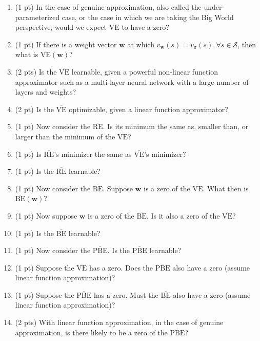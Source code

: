 \documentclass[main.tex]{subfiles}
\begin{document}
{\begin{enumerate}
    \item[(a)] (1 pt) In the case of genuine approximation, also called the under-parameterized case, or the case in which we are taking the Big World perspective, would we expect $\overline{\text{VE}}$ to have a zero?
    \item[(b)] (1 pt) If there is a weight vector $\mathbf{w}$ at which $v_\mathbf{w}(s) = v_\pi(s), \forall s \in \mathcal{S}$, then what is $\overline{\text{VE}}(\mathbf{w})$?
    \item[(c)] (2 pts) Is the $\overline{\text{VE}}$ learnable, given a powerful non-linear function approximator such as a multi-layer neural network with a large number of layers and weights?
    \item[(d)] (2 pt) Is the $\overline{\text{VE}}$ optimizable, given a linear function approximator?
    \item[(e)] (1 pt) Now consider the $\overline{\text{RE}}$. Is its minimum the same as, smaller than, or larger than the minimum of the $\overline{\text{VE}}$?
    \item[(f)] (1 pt) Is $\overline{\text{RE}}$'s minimizer the same as $\overline{\text{VE}}$'s minimizer?
    \item[(g)] (1 pt) Is the $\overline{\text{RE}}$ learnable?
    \item[(h)] (1 pt) Now consider the $\overline{\text{BE}}$. Suppose $\mathbf{w}$ is a zero of the $\overline{\text{VE}}$. What then is $\overline{\text{BE}}(\mathbf{w})$?
    \item[(i)] (1 pt) Now suppose $\mathbf{w}$ is a zero of the $\overline{\text{BE}}$. Is it also a zero of the $\overline{\text{VE}}$?
    \item[(j)] (1 pt) Is the $\overline{\text{BE}}$ learnable?
    \item[(k)] (1 pt) Now consider the $\overline{\text{PBE}}$. Is the $\overline{\text{PBE}}$ learnable?
    \item[(l)] (1 pt) Suppose the $\overline{\text{VE}}$ has a zero. Does the $\overline{\text{PBE}}$ also have a zero (assume linear function approximation)?
    \item[(m)] (1 pt) Suppose the $\overline{\text{PBE}}$ has a zero. Must the $\overline{\text{BE}}$ also have a zero (assume linear function approximation)?
    \item[(n)] (2 pts) With linear function approximation, in the case of genuine approximation, is there likely to be a zero of the $\overline{\text{PBE}}$?

\end{enumerate}}
\end{document}
